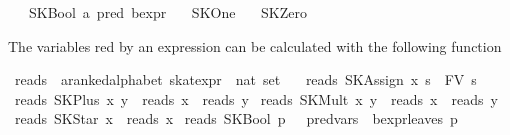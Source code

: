\begin{isabellebody}
\ \ {}\ SKBool\ {}{}a\ pred\ bexpr{}\isanewline
\ \ {}\ SKOne\isanewline
\ \ {}\ SKZero%
\begin{isamarkuptext}%
The variables red by an expression can be calculated with the following function%
\end{isamarkuptext}%
\isamarkuptrue%
\isamarkupfalse%
\ reads\ {}{}\ {}{}a{}{}ranked{}alphabet\ skat{}expr\ {}\ nat\ set{}\ \isanewline
\ \ {}reads\ {}SKAssign\ x\ s{}\ {}\ FV\ s{}\isanewline
{}\ {}reads\ {}SKPlus\ x\ y{}\ {}\ reads\ x\ {}\ reads\ y{}\isanewline
{}\ {}reads\ {}SKMult\ x\ y{}\ {}\ reads\ x\ {}\ reads\ y{}\isanewline
{}\ {}reads\ {}SKStar\ x{}\ {}\ reads\ x{}\isanewline
{}\ {}reads\ {}SKBool\ p{}\ {}\ {}\ {}pred{}vars\ {}\ bexpr{}leaves\ p{}{}\isanewline

\end{isabellebody}
